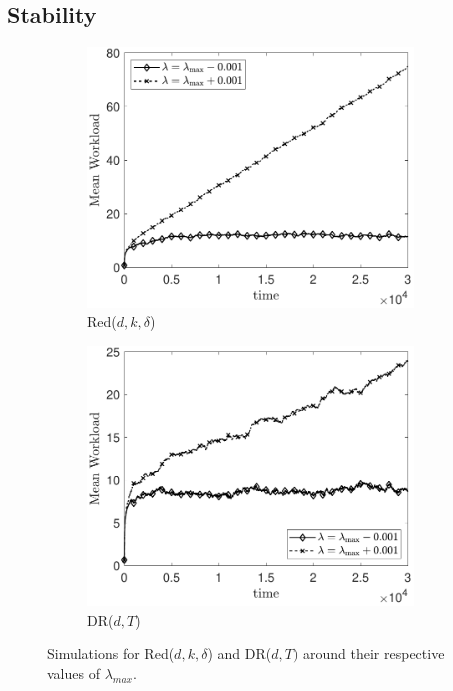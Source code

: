 \documentclass[12pt]{report}
\begin{document}
\subsection{Stability}\label{App:val_stab}
\begin{figure}[t]
\begin{subfigure}{.49\textwidth}
\centering
\includegraphics[width=0.95\textwidth]{figures/Chapter4/stability_Reddk.pdf}
\caption{Red($d,k,\delta$)}
\label{fig:stability_Reddk}
\end{subfigure}
\begin{subfigure}{.49\textwidth}
\centering
\includegraphics[width=0.95\textwidth]{figures/Chapter4/Stability_DR.pdf}
\caption{DR($d,T$)}
\label{fig:stability_DR}
\end{subfigure}
\caption{Simulations for Red($d,k,\delta$) and DR($d,T)$ around their respective values of $\lambda_{max}$.}
\label{fig:stability}
\end{figure}
\end{document}
